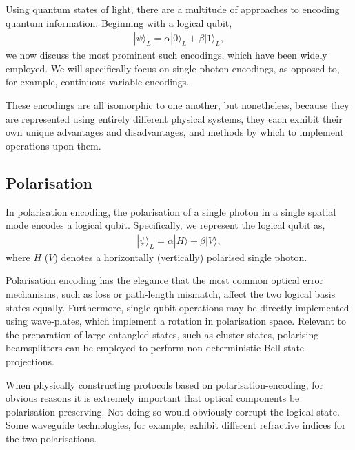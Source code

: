 \documentclass[times,final]{elsarticle}
\newcommand{\ket}[1]{|#1\rangle}
\begin{document}
Using quantum states of light, there are a multitude of approaches to encoding quantum information. Beginning with a logical qubit,
\begin{align}
\ket\psi_L = \alpha \ket{0}_L + \beta\ket{1}_L,
\end{align}
we now discuss the most prominent such encodings, which have been widely employed. We will specifically focus on single-photon encodings, as opposed to, for example, continuous variable encodings.

These encodings are all isomorphic to one another, but nonetheless, because they are represented using entirely different physical systems, they each exhibit their own unique advantages and disadvantages, and methods by which to implement operations upon them.


\subsection{Polarisation}

In polarisation encoding, the polarisation of a single photon in a single spatial mode encodes a logical qubit. Specifically, we represent the logical qubit as,
\begin{align}
\ket\psi_L = \alpha\ket{H} + \beta\ket{V},	
\end{align}
where $H$ ($V$) denotes a horizontally (vertically) polarised single photon.

Polarisation encoding has the elegance that the most common optical error mechanisms, such as loss or path-length mismatch, affect the two logical basis states equally. Furthermore, single-qubit operations may be directly implemented using wave-plates, which implement a rotation in polarisation space. Relevant to the preparation of large entangled states, such as cluster states, polarising beamsplitters can be employed to perform non-deterministic Bell state projections.

When physically constructing protocols based on polarisation-encoding, for obvious reasons it is extremely important that optical components be polarisation-preserving. Not doing so would obviously corrupt the logical state. Some waveguide technologies, for example, exhibit different refractive indices for the two polarisations.
\end{document}

